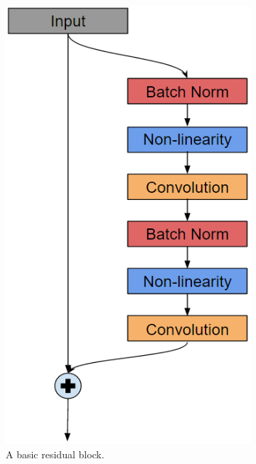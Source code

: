 \begin{figure}
    \centering
    \begin{subfigure}[b]{0.39\textwidth}
        \centering
        \includegraphics[width=\textwidth]{figures/basic.png}
        \caption{A basic residual block.}
				\label{f:basic}
    \end{subfigure}
    \hfill
		\begin{subfigure}[b]{0.59\textwidth}
        \centering

\end{subfigure}
\end{figure}
